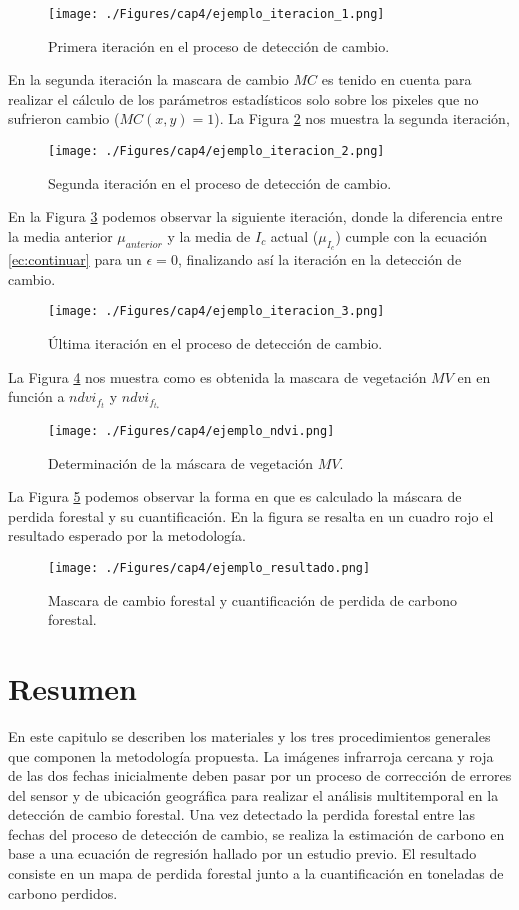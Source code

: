\begin{figure}[H]
	\centering
	\texttt{[image: ./Figures/cap4/ejemplo\_iteracion\_1.png]}
	\caption{Primera iteraci\'on en el proceso de detecci\'on de cambio.}
	\label{fig:ejemplo_2}
\end{figure}
En la segunda iteraci\'on la mascara de cambio $ MC $ es tenido en cuenta para realizar el c\'alculo de los par\'ametros estad\'isticos solo sobre los pixeles que no sufrieron cambio ($ MC(x,y)=1 $). La Figura \ref{fig:ejemplo_3} nos muestra la segunda iteraci\'on, 
\begin{figure}[H]
	\centering
	\texttt{[image: ./Figures/cap4/ejemplo\_iteracion\_2.png]}
	\caption{Segunda iteraci\'on en el proceso de detecci\'on de cambio.}
	\label{fig:ejemplo_3}
\end{figure}
En la Figura \ref{fig:ejemplo_4} podemos observar la siguiente iteraci\'on, donde la diferencia entre la media anterior $ \mu_{anterior} $ y la media de $ I_{c} $ actual ($ \mu_{I_{c}} $) cumple con la ecuaci\'on \ref{ec:continuar} para un $\epsilon=0 $, finalizando as\'i la iteraci\'on en la detecci\'on de cambio.
\begin{figure}[H]
	\centering
	\texttt{[image: ./Figures/cap4/ejemplo\_iteracion\_3.png]}
	\caption{\'Ultima iteraci\'on en el proceso de detecci\'on de cambio.}
	\label{fig:ejemplo_4}
\end{figure}
La Figura \ref{fig:ejemplo_5} nos muestra como es obtenida la mascara de vegetaci\'on $ MV $ en en funci\'on a $ ndvi_{f_{t}} $ y $ ndvi_{f_{t_{*}}} $
\begin{figure}[H]
	\centering
	\texttt{[image: ./Figures/cap4/ejemplo\_ndvi.png]}
	\caption{Determinaci\'on de la m\'ascara de vegetaci\'on $ MV $.}
	\label{fig:ejemplo_5}
\end{figure}
La Figura \ref{fig:ejemplo_6} podemos observar la forma en que es calculado la m\'ascara de perdida forestal y su cuantificaci\'on. En la figura se resalta en un cuadro rojo el resultado esperado por la metodología. 
\begin{figure}[H]
	\centering
	\texttt{[image: ./Figures/cap4/ejemplo\_resultado.png]}
	\caption{Mascara de cambio forestal y cuantificaci\'on de perdida de carbono forestal.}
	\label{fig:ejemplo_6}
\end{figure}
\section{Resumen}
En este capitulo se describen los materiales y los tres procedimientos generales que componen la metodolog\'ia propuesta. La im\'agenes infrarroja cercana y roja de las dos fechas inicialmente deben pasar por un proceso de correcci\'on de errores del sensor y de ubicaci\'on geogr\'afica para realizar el an\'alisis multitemporal en la detecci\'on de cambio forestal. Una vez detectado la perdida forestal entre las fechas del proceso de detecci\'on de cambio, se realiza la estimaci\'on de carbono en base a una ecuaci\'on de regresi\'on hallado por un estudio previo. El resultado consiste en un mapa de perdida forestal junto a la cuantificaci\'on en toneladas de carbono perdidos.